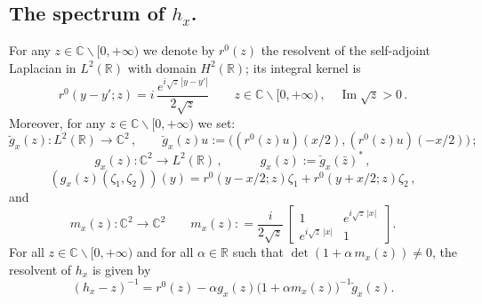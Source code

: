 \documentclass[a4paper,11pt,reqno]{amsart}
\theoremstyle{definition}
\numberwithin{equation}{section}
\newcommand{\CO}{\mathbb C}
\newcommand{\RE}{\mathbb R}
\newcommand{\brevegg}{\breve{g}}
\newcommand{\bfg}{{g}}
\newcommand{\mm}{{ m}}
\renewcommand{\Im}{\operatorname{Im}}
\begin{document}
\subsection{The spectrum of  \texorpdfstring{$h_x$}{hx}.} For any $z\in \CO\backslash [0,+\infty)$ we denote by $r^{0}(z)$ the resolvent of the self-adjoint Laplacian in $L^{2}(\RE)$ with domain $H^2(\RE)$; its integral kernel is 
\[
 r^{0}(y-y';z)  = i \,  \frac{e^{i\sqrt{z} \,| y - y'| }}{2\sqrt{z}} \qquad z\in \CO\backslash [0,+\infty)\,, \quad\Im \sqrt z>0\,. 
\]
Moreover, for any $z\in \CO\backslash [0,+\infty)$ we set: 
\[\brevegg_x(z):   L^2(\RE) \to \CO^{2}\,,\qquad
\brevegg_x(z) u :=\big((r^{0}(z)u) (x/2),  (r^{0}(z)u) (-x/2)\big)\,;
\]
\[
\bfg_x(z): \CO^{2}\to L^2(\RE)\,, \qquad \quad \bfg_x(z):= \brevegg_x(\bar z)^*\,,
\]
\[
(\bfg_x(z)(\zeta_{1},\zeta_{2}))(y)=r^{0}(y-x/2;z)\zeta_{1}+r^{0}(y+x/2;z)\zeta_{2}\,,
\]
and 
\begin{equation*}%
\mm_x(z) :\CO^2 \to \CO^2 \qquad \mm_x(z) : = \frac{i}{2 \sqrt{z}}\,\begin{bmatrix}
 1&   e^{i\sqrt{z}\,|x|} \,\\ 
  e^{i\sqrt{z}\,|x|} & 1 
\end{bmatrix}.
\end{equation*}
For all  $z\in \CO\backslash [0,+\infty)$ and for all $\alpha\in\RE$ such that $\det(1+\alpha\,\mm_{x}(z))\not=0$,  the resolvent of $h_x$ is given by 
\begin{equation*}%
    (h_x - z)^{-1}= r^{0}(z)-\alpha
\bfg_x(z)\big(1+\alpha\mm_x(z)\big)^{-1}\brevegg_x(z).
\end{equation*}
\end{document}
